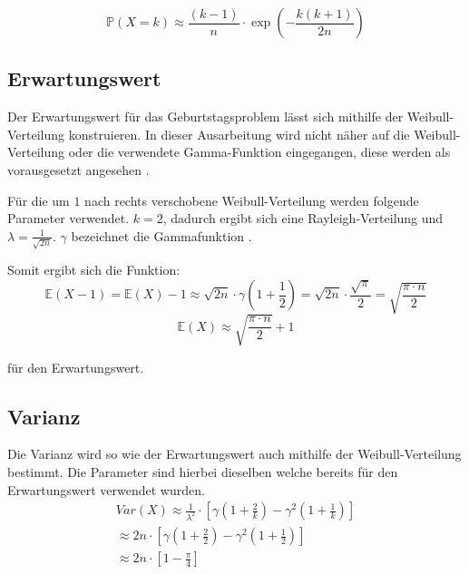 \documentclass[../main.tex]{subfiles}
\begin{document}
\begin{flushleft}
\begin{equation}
\mathbb{P}(X = k) \approx \frac{ (k-1) }{ n } \cdot \exp( - \frac{ k (k + 1) }{ 2n } )
\end{equation}

 \subsection{Erwartungswert}

Der Erwartungswert für das Geburtstagsproblem lässt sich mithilfe der Weibull-Verteilung konstruieren. In dieser Ausarbeitung wird nicht näher auf die Weibull-Verteilung oder die verwendete Gamma-Funktion eingegangen, diese werden als vorausgesetzt angesehen \cite{rinne}.  \newline

Für die um $1$ nach rechts verschobene Weibull-Verteilung werden folgende Parameter verwendet. $k = 2$, dadurch ergibt sich eine Rayleigh-Verteilung und $\lambda = \frac{ 1 }{ \sqrt{2n} }$.
$\gamma$ bezeichnet die Gammafunktion \cite{rinne}. \newline

Somit ergibt sich die Funktion:
\begin{equation}
\mathbb{E}(X - 1) = \mathbb{E}(X) - 1 \approx \sqrt{ 2n } \cdot \gamma (1 + \frac{ 1 }{ 2 } ) = \sqrt{ 2n } \cdot \frac{ \sqrt{ \pi } }{ 2 } = \sqrt{ \frac{ \pi \cdot n }{ 2 } }
\end{equation}
\begin{equation}
\mathbb{E}(X) \approx \sqrt{ \frac{ \pi \cdot n }{ 2 } } + 1
\end{equation}

für den Erwartungswert.

 \subsection{Varianz}

Die Varianz wird so wie der Erwartungswert auch mithilfe der Weibull-Verteilung bestimmt. Die Parameter sind hierbei dieselben welche bereits für den Erwartungswert verwendet wurden\cite{rinne}.
\begin{eqnarray}
Var(X) \approx \frac{ 1 }{ \lambda^{ 2 } } \cdot [\gamma (1+\frac{ 2 }{ k }) - \gamma^{ 2 }(1+\frac{ 1 }{ k } )]   \label{eq:08}\\
\approx 2n \cdot [\gamma(1+\frac{ 2 }{ 2 }) - \gamma^{ 2 }(1+\frac{ 1 }{ 2 } )] \\
\approx 2n \cdot [1 - \frac{ \pi }{ 4 }]
\end{eqnarray}


\end{flushleft}
\end{document}

